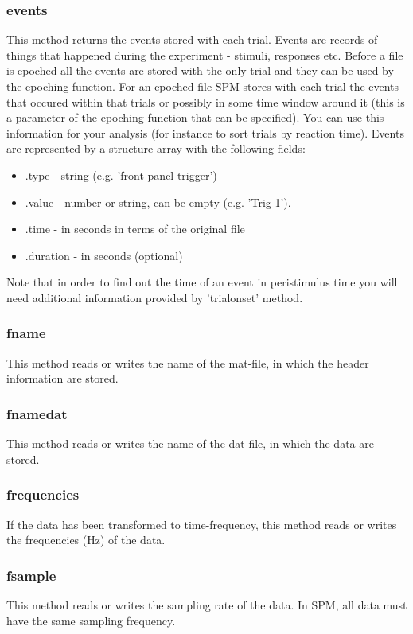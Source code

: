 \subsubsection{events}
This method returns the events stored with each trial. Events are records
of things that happened during the experiment - stimuli, responses etc.
Before a file is epoched all the events are stored with the only trial and they 
can be used by the epoching function. For an epoched file SPM stores with each trial
the events that occured within that trials or possibly in some time window around it
(this is a parameter of the epoching function that can be specified). You can use this
information for your analysis (for instance to sort trials by reaction time). Events
are represented by a structure array with the following fields:

\begin{itemize}
\item .type - string (e.g. 'front panel trigger')
\item .value - number or string, can be empty (e.g. 'Trig 1').
\item .time - in seconds in terms of the original file
\item .duration - in seconds (optional)
\end{itemize}

Note that in order to find out the time of an event in peristimulus time
you will need additional information provided by 'trialonset' method.

\subsubsection{fname}
This method reads or writes the name of the mat-file, in which the
header information are stored. 

\subsubsection{fnamedat}
This method reads or writes the name of the dat-file, in which the
data are stored. 

\subsubsection{frequencies}
If the data has been transformed to time-frequency, this method reads
or writes the frequencies (Hz) of the data.

\subsubsection{fsample}
This method reads or writes the sampling rate of the data. In SPM, all
data must have the same sampling frequency.


